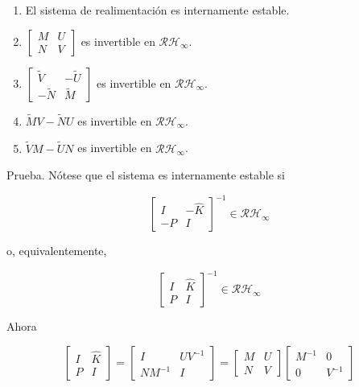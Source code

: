 \begin{enumerate}
  \item El sistema de realimentación es internamente estable.
  \item $\left[\begin{array}{cc}M & U \\ N & V\end{array}\right]$ es invertible en $\mathcal{R} \mathcal{H}_{\infty}$.
  \item $\left[\begin{array}{cc}\tilde{V} & -\tilde{U} \\ -\tilde{N} & \tilde{M}\end{array}\right]$ es invertible en $\mathcal{R} \mathcal{H}_{\infty}$.
  \item $\tilde{M} V-\tilde{N} U$ es invertible en $\mathcal{R} \mathcal{H}_{\infty}$.
  \item $\tilde{V} M-\tilde{U} N$ es invertible en $\mathcal{R} \mathcal{H}_{\infty}$.
\end{enumerate}

Prueba. Nótese que el sistema es internamente estable si

$$
\left[\begin{array}{cc}
I & -\hat{K} \\
-P & I
\end{array}\right]^{-1} \in \mathcal{R} \mathcal{H}_{\infty}
$$

o, equivalentemente,

\[
\left[\begin{array}{cc}
I & \hat{K}  \tag{5.12}\\
P & I
\end{array}\right]^{-1} \in \mathcal{R} \mathcal{H}_{\infty}
\]

Ahora

$$
\left[\begin{array}{cc}
I & \hat{K} \\
P & I
\end{array}\right]=\left[\begin{array}{cc}
I & U V^{-1} \\
N M^{-1} & I
\end{array}\right]=\left[\begin{array}{cc}
M & U \\
N & V
\end{array}\right]\left[\begin{array}{cc}
M^{-1} & 0 \\
0 & V^{-1}
\end{array}\right]
$$

